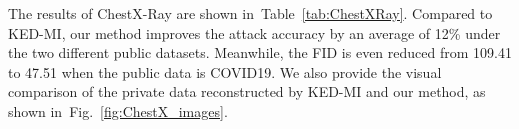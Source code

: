 \documentclass[letterpaper]{article} %
\newcommand{\Tref}[1]{Table~\ref{#1}}
\newcommand{\Fref}[1]{Fig.~\ref{#1}}
\begin{document}
The results of ChestX-Ray are shown in~\Tref{tab:ChestXRay}. Compared to KED-MI, our method improves the attack accuracy by an average of 12\% under the two different public datasets. Meanwhile, the FID is even reduced from 109.41 to 47.51 when the public data is COVID19. We also provide the visual comparison of the private data reconstructed by KED-MI and our method, as shown in~\Fref{fig:ChestX_images}.

\begin{table}[!ht] \LARGE
		\begin{center}
		\end{center}
		\caption{Attack performance comparison on MNIST and CIFAR10.}
		\label{tab:MNIST_CIFAR}
\end{table}	
\end{document}
